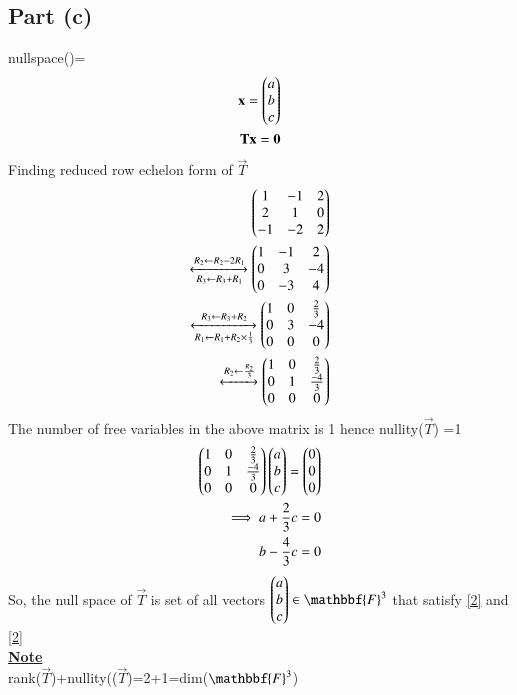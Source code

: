 \documentclass[journal,12pt,twocolumn]{IEEEtran}
\begin{document}
\subsection{Part (c)}
nullspace()=
\begin{align}
\mathbf{x}=\begin{pmatrix}a\\b\\c\end{pmatrix}\\
    \mathbf{T}\mathbf{x}=\mathbf{0}
    \end{align}
    Finding reduced row echelon form of $\vec{T}$
    \begin{align}
    \begin{pmatrix}1&-1&2\\2&1&0\\-1&-2&2\end{pmatrix}\\
    \xleftrightarrow[R_3\leftarrow R_3+R_1]{R_2\leftarrow R_2-2R_1}\begin{pmatrix}1&-1&2\\0&3&-4\\0&-3&4\end{pmatrix}\\\xleftrightarrow[R_1\leftarrow R_1+R_2\times \frac{1}{3}]{R_3\leftarrow R_3+R_2}\begin{pmatrix}1&0&\frac{2}{3}\\0&3&-4\\0&0&0\end{pmatrix}\\
     \xleftrightarrow[]{R_2\leftarrow \frac{R_2}{3}}\begin{pmatrix}1&0&\frac{2}{3}\\0&1&\frac{-4}{3}\\0&0&0\end{pmatrix}
\end{align}
The number of free variables in the above matrix is 1 hence nullity($\vec{T}$) =1\\
\begin{align}
    \begin{pmatrix}1&0&\frac{2}{3}\\0&1&\frac{-4}{3}\\0&0&0\end{pmatrix}\begin{pmatrix}a\\b\\c\end{pmatrix}=\begin{pmatrix}0\\0\\0\end{pmatrix}
    \\\implies a+\frac{2}{3}c=0\label{2}\\b-\frac{4}{3}c=0\label{3}
\end{align}
So, the null space of $\vec{T}$ is set of all vectors $\myvec{a\\b\\c} \in \mathbbf{F}^3$ that satisfy \eqref{2} and \eqref{2}\\
\underline{\textbf{Note}}\\
rank($\vec{T}$)+nullity(($\vec{T}$)=2+1=dim($ \mathbbf{F}^3$)
\end{document}

